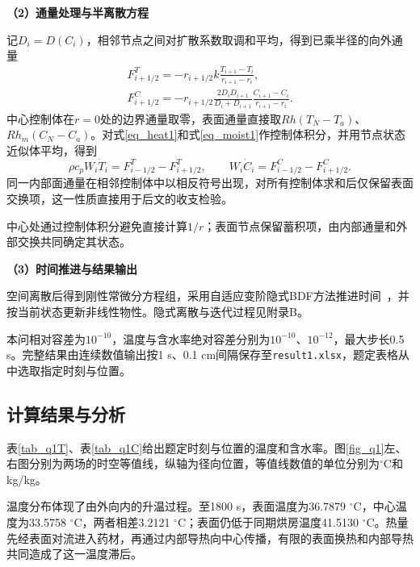 \medskip
\noindent\textbf{（2）通量处理与半离散方程}

记$D_i=D(C_i)$，相邻节点之间对扩散系数取调和平均，得到已乘半径的向外通量
\begin{equation}\label{eq_flux}
\begin{gathered}
F^T_{i+1/2}=-r_{i+1/2}k\frac{T_{i+1}-T_i}{r_{i+1}-r_i},\\
F^C_{i+1/2}=-r_{i+1/2}\frac{2D_iD_{i+1}}{D_i+D_{i+1}}
\frac{C_{i+1}-C_i}{r_{i+1}-r_i}.
\end{gathered}
\end{equation}
中心控制体在$r=0$处的边界通量取零，表面通量直接取$Rh(T_N-T_a)$、$Rh_m(C_N-C_a)$。对式\eqref{eq_heat1}和式\eqref{eq_moist1}作控制体积分，并用节点状态近似体平均，得到
\begin{equation}\label{eq_fvm}
\rho c_pW_i\dot T_i=F^T_{i-1/2}-F^T_{i+1/2},\qquad
W_i\dot C_i=F^C_{i-1/2}-F^C_{i+1/2}.
\end{equation}
同一内部面通量在相邻控制体中以相反符号出现，对所有控制体求和后仅保留表面交换项，这一性质直接用于后文的收支检验。

中心处通过控制体积分避免直接计算$1/r$；表面节点保留蓄积项，由内部通量和外部交换共同确定其状态。

\medskip
\noindent\textbf{（3）时间推进与结果输出}

空间离散后得到刚性常微分方程组，采用自适应变阶隐式BDF方法推进时间~\cite{bdf}，并按当前状态更新非线性物性。隐式离散与迭代过程见附录B。

本问相对容差为$10^{-10}$，温度与含水率绝对容差分别为$10^{-10}$、$10^{-12}$，最大步长0.5 s。完整结果由连续数值输出按1 s、0.1 cm间隔保存至\texttt{result1.xlsx}，题定表格从中选取指定时刻与位置。

\subsection{计算结果与分析}
表\ref{tab_q1T}、表\ref{tab_q1C}给出题定时刻与位置的温度和含水率。图\ref{fig_q1}左、右图分别为两场的时空等值线，纵轴为径向位置，等值线数值的单位分别为$^\circ$C和kg/kg。



\FloatBarrier

温度分布体现了由外向内的升温过程。至1800 s，表面温度为36.7879 $^\circ$C，中心温度为33.5758 $^\circ$C，两者相差3.2121 $^\circ$C；表面仍低于同期烘房温度41.5130 $^\circ$C。热量先经表面对流进入药材，再通过内部导热向中心传播，有限的表面换热和内部导热共同造成了这一温度滞后。

